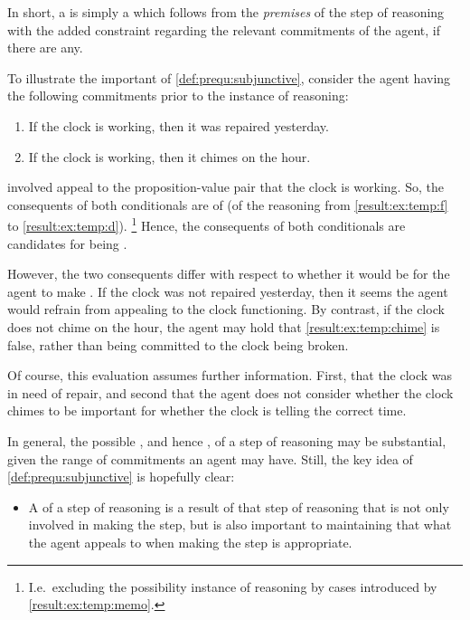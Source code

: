\begin{note}
  In short, a  is simply a  which follows from the \emph{premises} of the step of reasoning with the added constraint regarding the relevant commitments of the agent, if there are any.
\end{note}

\begin{note}
  To illustrate the important of \ref{def:prequ:subjunctive}, consider the agent having the following commitments prior to the instance of reasoning:

  \begin{enumerate}[label=B\(^{+}\)\arabic*., ref=(B\(^{+}\)\arabic*)]
  \item
    \label{result:ex:temp:repair}
    If the clock is working, then it was repaired yesterday.
  \item
    \label{result:ex:temp:chime}
    If the clock is working, then it chimes on the hour.
  \end{enumerate}

  \CStepB{} involved appeal to the proposition-value pair that the clock is working.
  So, the consequents of both conditionals are  of \CStepB{} (of the reasoning from \ref{result:ex:temp:f} to \ref{result:ex:temp:d}).\nolinebreak
  \footnote{
    I.e.\ excluding the possibility instance of reasoning by cases introduced by \ref{result:ex:temp:memo}.
  }
  Hence, the consequents of both conditionals are candidates for being .

  However, the two consequents differ with respect to whether it would be \epVAd{} for the agent to make \CStepB{}.
  If the clock was not repaired yesterday, then it seems the agent would refrain from appealing to the clock functioning.
  By contrast, if the clock does not chime on the hour, the agent may hold that \ref{result:ex:temp:chime} is false, rather than being committed to the clock being broken.

  Of course, this evaluation assumes further information.
  First, that the clock was in need of repair, and second that the agent does not consider whether the clock chimes to be important for whether the clock is telling the correct time.

  In general, the possible , and hence , of a step of reasoning may be substantial, given the range of commitments an agent may have.
  Still, the key idea of \ref{def:prequ:subjunctive} is hopefully clear:
  \begin{itemize}
  \item
    A \prequ{} of a step of reasoning is a result of that step of reasoning that is not only involved in making the step, but is also important to maintaining that what the agent appeals to when making the step is appropriate.
  \end{itemize}
\end{note}

